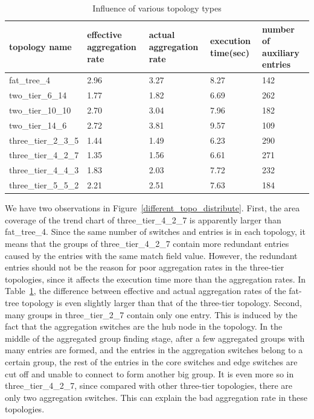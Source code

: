 \documentclass[conference]{IEEEtran}
\begin{document}
\begin{table}
\centering
\caption{Influence of various topology types}
\begin{tabular}{|l|p{2.5cm}|p{2.5cm}|p{1.9cm}|p{2.8cm}|}
\hline topology name & effective aggregation rate & actual aggregation rate & execution time(sec) & number of auxiliary entries \\
\hline
\hline fat\_tree\_4 & 2.96 & 3.27 & 8.27 & 142 \\
\hline two\_tier\_6\_14 & 1.77 & 1.82 & 6.69 & 262 \\ 
\hline two\_tier\_10\_10 & 2.70 & 3.04 & 7.96 & 182 \\
\hline two\_tier\_14\_6 & 2.72 & 3.81 & 9.57 & 109 \\ 
\hline three\_tier\_2\_3\_5 & 1.44 & 1.49 & 6.23 & 290 \\
\hline three\_tier\_4\_2\_7 & 1.35 & 1.56 & 6.61 & 271 \\
\hline three\_tier\_4\_4\_3 & 1.83 & 2.03 & 7.72 & 232 \\
\hline three\_tier\_5\_5\_2 & 2.21 & 2.51 & 7.63 & 184 \\
\hline
\end{tabular}
\label{table:different_topo_type}
\end{table}

We have two observations in Figure~\ref{different_topo_distribute}. First, the area coverage of the trend chart of three\_tier\_4\_2\_7 is apparently larger than fat\_tree\_4. Since the same number of switches and entries is in each topology, it means that the groups of three\_tier\_4\_2\_7 contain more redundant entries caused by the entries with the same match field value. However, the redundant entries should not be the reason for poor aggregation rates in the three-tier topologies, since it affects the execution time more than the aggregation rates. In Table~\ref{table:different_topo_type}, the difference between effective and actual aggregation rates of the fat-tree topology is even slightly larger than that of the three-tier topology. Second, many groups in three\_tier\_2\_7 contain only one entry. This is induced by the fact that the aggregation switches are the hub node in the topology. In the middle of the aggregated group finding stage, after a few aggregated groups with many entries are formed, and the entries in the aggregation switches belong to a certain group, the rest of the entries in the core switches and edge switches are cut off and unable to connect to form another big group. It is even more so in three\_tier\_4\_2\_7, since compared with other three-tier topologies, there are only two aggregation switches. This can explain the bad aggregation rate in these topologies.
\end{document}
